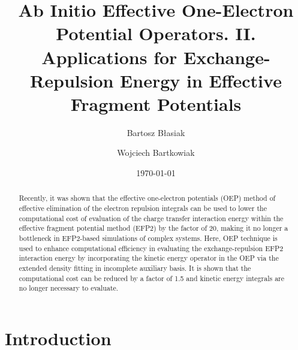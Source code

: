 


\title{Ab Initio Effective One-Electron Potential Operators. II.
Applications for Exchange-Repulsion Energy in Effective Fragment Potentials}

\author{Bartosz B{\l}asiak}

\author{Wojciech Bartkowiak}


\date{\today}

\begin{abstract}
Recently, it was shown that
the effective one\hyp{}electron potentials (OEP) method
of effective elimination of the electron repulsion integrals
can be used to lower the computational cost
of evaluation of the charge transfer interaction energy
within the effective fragment potential method (EFP2)
by the factor of 20, making it no longer a bottleneck
in EFP2\hyp{}based simulations of complex systems.
Here, OEP technique 
is used to enhance computational efficiency in evaluating the
exchange\hyp{}repulsion EFP2 interaction energy
by incorporating the kinetic energy operator in the OEP
via the extended density fitting in incomplete auxiliary basis.
It is shown that the computational cost can be reduced by a factor
of 1.5 and kinetic energy integrals are no longer necessary to evaluate.
\end{abstract}

\pacs{}

\maketitle

\tableofcontents

\section{\label{s:1.introduction}Introduction}

